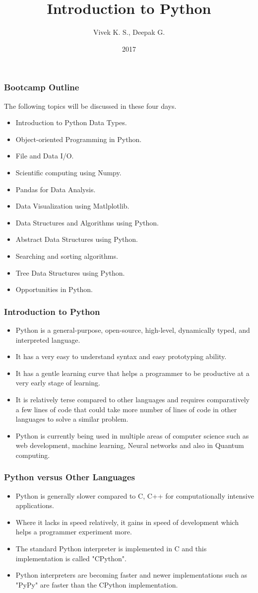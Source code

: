 \documentclass{beamer}
\title{Introduction to Python}
\author{Vivek K. S., Deepak G.}
\institute{Information Systems Decision Sciences (ISDS)\\
MUMA College of Business\\
University of South Florida \\
Tampa, Florida}
\date{2017}
\begin{document}
 
\frame{\titlepage}

\begin{frame}
\frametitle{Bootcamp Outline}
The following topics will be discussed in these four days.
\begin{itemize}
\item Introduction to Python Data Types.
\item Object-oriented Programming in Python.
\item File and Data I/O.
\item Scientific computing using Numpy. 
\item Pandas for Data Analysis.
\item Data Visualization using Matlplotlib.
\item Data Structures and Algorithms using Python.
\item Abstract Data Structures using Python.
\item Searching and sorting algorithms.
\item Tree Data Structures using Python.
\item Opportunities in Python. 
\end{itemize}
\end{frame}


\begin{frame}
\frametitle{Introduction to Python}
\begin{itemize}
\item Python is a general-purpose, open-source, high-level, dynamically typed, and interpreted language.
\item It has a very easy to understand syntax and easy prototyping ability.
\item It has a gentle learning curve that helps a  programmer to be productive at a very early stage of learning.
\item It is relatively terse compared to other languages and requires comparatively  a few lines of code that could take more number of lines of code in other languages to solve a similar problem.
\item Python is currently being used in multiple areas of computer science such as web development, machine learning, Neural networks and also in Quantum computing.
\end{itemize}
\end{frame}

\begin{frame}
\frametitle{Python versus Other Languages}
\begin{itemize}
\item Python is generally slower compared to C, C++ for computationally intensive applications.
\item Where it lacks in speed relatively, it gains in speed of development which helps a programmer experiment more.
\item The standard Python interpreter is implemented in C and this implementation is called "CPython".
\item Python interpreters are becoming faster and newer implementations such as "PyPy" are faster than the CPython implementation.
\end{itemize}
\end{frame}
\end{document}
